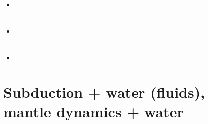 \begin{scriptsize}
\begin{itemize}
\textcite{fegb19} \\
\item[\twothousandtwenty] 
\textcite{thsc20} \\
\textcite{rixu20} \\
\item[\twothousandtwentyone] 
\textcite{erhf21} \\
\textcite{lule21} \\
\item[\twothousandtwentytwo] 
\textcite{peli22} \\
\end{itemize}
\end{scriptsize}

\section{Subduction + water (fluids), mantle dynamics + water}

